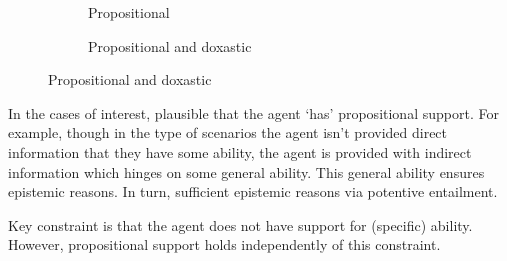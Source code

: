 \begin{figure}[!h]
  \begin{subfigure}{.5\linewidth}
    \centering
    \caption{Propositional}
  \end{subfigure}
  \begin{subfigure}{.5\linewidth}
    \centering
    \caption{Propositional and doxastic}
  \end{subfigure}
\end{figure}

\begin{note}
  In the cases of interest, plausible that the agent `has' propositional support.
  For example, though in the type of scenarios the agent isn't provided direct information that they have some ability, the agent is provided with indirect information which hinges on some general ability.
  This general ability ensures epistemic reasons.
  In turn, sufficient epistemic reasons via potentive entailment.

  Key constraint is that the agent does not have support for (specific) ability.
  However, propositional support holds independently of this constraint.
\end{note}

